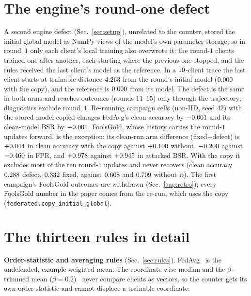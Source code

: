 \documentclass[journal]{IEEEtran}
\begin{document}
\section{The engine's round-one defect}
\label{sup:alias}
A second engine defect (Sec.~\ref{sec:setup}), unrelated to the counter, stored the
initial global model as NumPy views of the model's own parameter storage, so in
round~$1$ only each client's local training also overwrote it: the round-$1$ clients
trained one after another, each starting where the previous one stopped, and the rules
received the last client's model as the reference. In a $10$-client trace
the last client starts at trainable distance $4.263$ from the round's
initial model ($0.000$ with the copy), and the reference is
$0.000$ from its model. The defect is the same in both arms and reaches
outcomes (rounds $11$--$15$) only through the trajectory; diagnostics exclude round~$1$.
Re-running campaign cells (non-IID, seed $42$) with the stored model copied changes
FedAvg's clean accuracy by $-0.001$ and its clean-model BSR by
$-0.001$. FoolsGold, whose history carries the round-$1$ updates
forward, is the exception: its clean-run arm difference (fixed$-$defect) is
$+0.044$ in clean accuracy with the copy against
$+0.100$ without, $-0.200$ against
$-0.460$ in FPR, and $+0.978$ against
$+0.945$ in attacked BSR. With the copy it excludes most of the ten
round-$1$ updates and never recovers (clean accuracy $0.288$ defect,
$0.332$ fixed, against $0.608$ and
$0.709$ without it). The first campaign's FoolsGold outcomes are
withdrawn (Sec.~\ref{sup:retro}); every FoolsGold number in the paper comes from the
re-run, which uses the copy (\texttt{federated.copy\_initial\_global}).

\section{The thirteen rules in detail}
\label{sup:rules}
\textbf{Order-statistic and averaging rules} (Sec.~\ref{sec:rules}). FedAvg~\cite{mcmahan2017}
is the undefended, example-weighted mean. The coordinate-wise median and the
$\beta$-trimmed mean ($\beta=0.2$)~\cite{yin2018} never compare clients as vectors, so
the counter gets its own order statistic and cannot displace a trainable coordinate.
\end{document}
